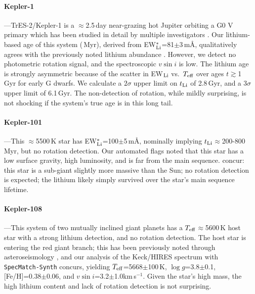 \documentclass[11pt,twocolumn,tighten,linenumbers,trackchanges]{aastex63}
\newcommand{\kms}{{km\,s$^{-1}$}}
\begin{document}
\paragraph{Kepler-1}---TrES-2/Kepler-1 \citep{2006ApJ...651L..61O} is
a $\approx$2.5\,day near-grazing hot Jupiter orbiting a G0 V primary
which has been studied in detail by multiple investigators
\citep[e.g.][]{2007ApJ...664.1190S,2008ApJ...682.1283W,2011ApJ...733...36K,2011MNRAS.417.2166S}.
Our lithium-based age of this system (\trestwotli\,Myr), derived from
EW$_{\rm Li}^{\ast}$=81$\pm$3\,m\AA, qualitatively agrees with the
previously noted lithium abundance \citep{2007ApJ...664.1190S}.
However, we detect no photometric rotation signal, and the
spectroscopic $v\sin i$ is low.  The lithium age is strongly
asymmetric because of the scatter in EW$_{\rm Li}$ vs.~$T_{\rm eff}$
over ages $t$$\gtrsim$1\,Gyr for early G dwarfs.  We calculate a
$2\sigma$ upper limit on $t_{\rm Li}$ of 2.8\,Gyr, and a $3\sigma$
upper limit of 6.1\,Gyr.  The non-detection of rotation, while mildly
surprising, is not shocking if the system's true age is in this long
tail.

\paragraph{Kepler-101}---This $\approx$5500\,K star has EW$_{\rm
Li}^{\ast}$=100$\pm$5\,m\AA, nominally implying $t_{\rm
Li}$$\approx$200-800\,Myr, but no rotation detection.  Our automated
flags noted that this star has a low surface gravity, high luminosity,
and is far from the main sequence.  \citet{2014A&A...572A...2B}
concur: this star is a sub-giant slightly more massive than the Sun;
no rotation detection is expected; the lithium likely simply survived
over the star's main sequence lifetime.

\paragraph{Kepler-108}---This system of two mutually inclined giant
planets \citep{2017AJ....153...45M} has a $T_{\rm
eff}$$\approx$5600\,K host star with a strong lithium detection, and
no rotation detection.  The host star is entering the red giant
branch; this has been previously noted through asteroseismology
\citep{2013ApJ...767..127H}, and our analysis of the Keck/HIRES
spectrum with \texttt{SpecMatch-Synth} \citep{2017AJ....154..107P}
concurs, yielding $T_{\rm eff}$=5668$\pm$100\,K, $\log g$=3.8$\pm$0.1,
[Fe/H]=0.38$\pm$0.06, and $v\sin i$=3.2$\pm$1.0\kms.  Given the star's
high mass, the high lithium content and lack of rotation detection is
not surprising.
\end{document}
